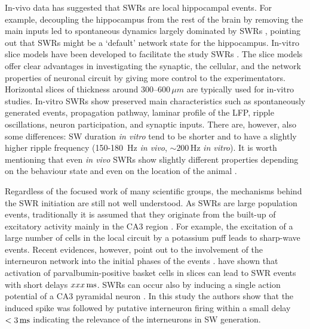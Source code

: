     In-vivo data has suggested that SWRs are local hippocampal events. For
    example, decoupling the hippocampus from the rest of the brain by removing
    the main inputs led to spontaneous dynamics largely dominated by SWRs
    \citep{Buzsaki1983}, pointing out that SWRs might be a `default' network
    state for the hippocampus. In-vitro slice models have been developed
    to facilitate the study SWRs \cite[e.g.,][]{Maier2002, Maier2003,
    Kubota2003, Colgin2004}. The slice models offer clear advantages in
    investigating the synaptic, the cellular, and the network properties of
    neuronal circuit by giving more control to the experimentators. Horizontal
    slices of thickness around 300--$600\, \mu m$ are typically used for
    in-vitro studies. In-vitro SWRs show preserved main characteristics such as
    spontaneously generated events, propagation pathway, laminar profile of the
    LFP, ripple oscillations, neuron participation, and synaptic inputs. There are,
    however, also some differences: SW duration \textit{in vitro} tend to be
    shorter and to have a slightly higher ripple frequency (150-180 \,\rm Hz \textit{in
    vivo}, $\sim 200$\,\rm Hz \textit{in vitro}). It is worth mentioning that even
    \textit{in vivo} SWRs show slightly different properties depending on the
    behaviour state and even on the location of the animal \citep{Buzsaki2015}.
    
    Regardless of the focused work of many scientific groups, the mechanisms
    behind the SWR initiation are still not well understood. As SWRs are large
    population events, traditionally it is assumed that they originate from the
    built-up of excitatory activity mainly in the CA3 region \citep{delaPrida2006,
    more}. For example, the excitation of a large number of cells in the local
    circuit by a potassium puff leads to sharp-wave events. Recent evidences,
    however, point out to the involvement of the interneuron network into the
    initial phases of the events \citep{Sasaki2014}. \cite{Schlingloff2014, Kohus2016} have shown
    that activation of parvalbumin-positive basket cells in slices can lead to
    SWR events with short delays $xxx \rm\, ms$. SWRs can occur also by inducing a
    single action potential of a CA3 pyramidal neuron \citep{Bazelot2015}. In
    this study the authors show that the induced spike was followed by putative
    interneuron firing within a small delay $<3\,\rm ms$ indicating the relevance
    of the interneurons in SW generation.

